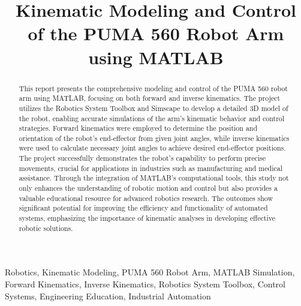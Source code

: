 \documentclass[conference]{IEEEtran}
\begin{document}
\title{Kinematic Modeling and Control of the PUMA 560 Robot Arm using MATLAB}
\author{
  \and
}

\maketitle

\begin{abstract}
This report presents the comprehensive modeling and control of the PUMA 560 robot arm using MATLAB, focusing on both forward and inverse kinematics. The project utilizes the Robotics System Toolbox and Simscape to develop a detailed 3D model of the robot, enabling accurate simulations of the arm's kinematic behavior and control strategies. Forward kinematics were employed to determine the position and orientation of the robot’s end-effector from given joint angles, while inverse kinematics were used to calculate necessary joint angles to achieve desired end-effector positions. The project successfully demonstrates the robot's capability to perform precise movements, crucial for applications in industries such as manufacturing and medical assistance. Through the integration of MATLAB's computational tools, this study not only enhances the understanding of robotic motion and control but also provides a valuable educational resource for advanced robotics research. The outcomes show significant potential for improving the efficiency and functionality of automated systems, emphasizing the importance of kinematic analyses in developing effective robotic solutions.
\end{abstract}

\begin{IEEEkeywords}
Robotics, Kinematic Modeling, PUMA 560 Robot Arm, MATLAB Simulation, Forward Kinematics, Inverse Kinematics, Robotics System Toolbox, Control Systems, Engineering Education, Industrial Automation
\end{IEEEkeywords}
\end{document}
